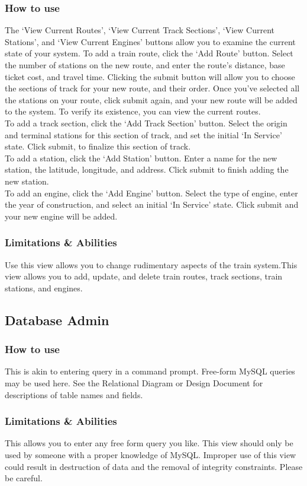 \documentclass[letter]{article}
\begin{document}
\subsubsection{How to use}
The `View Current Routes', `View Current Track Sections', `View Current Stations', and `View Current Engines' buttons allow you to examine the current state of your system.
To add a train route, click the `Add Route' button. Select the number of stations on the new route, and enter the route's distance, base ticket cost, and travel time. Clicking the submit button will allow you to choose the sections of track for your new route, and their order. Once you've selected all the stations on your route, click submit again, and your new route will be added to the system. To verify its existence, you can view the current routes.\\
To add a track section, click the `Add Track Section' button. Select the origin and terminal stations for this section of track, and set the initial `In Service' state. Click submit, to finalize this section of track. \\
To add a station, click the `Add Station' button. Enter a name for the new station, the latitude, longitude, and address. Click submit to finish adding the new station. \\
To add an engine, click the `Add Engine' button. Select the type of engine, enter the year of construction, and select an initial `In Service' state. Click submit and your new engine will be added.
\subsubsection{Limitations \& Abilities}
Use this view allows you to change rudimentary aspects of the train system.This view allows you to add, update, and delete train routes, track sections, train stations, and engines.

\subsection{Database Admin}
\subsubsection{How to use}
This is akin to entering query in a command prompt. Free-form MySQL queries may be used here. See the Relational Diagram or Design Document for descriptions of table names and fields.

\subsubsection{Limitations \& Abilities}
This allows you to enter any free form query you like. This view should only be used by someone with a proper knowledge of MySQL. Improper use of this view could result in destruction of data and the removal of integrity constraints. Please be careful.


\end{document}
